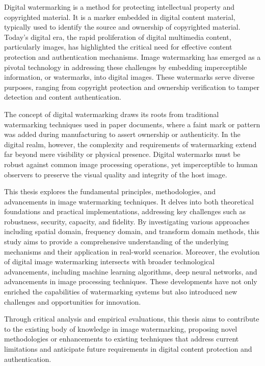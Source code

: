 Digital watermarking is a method for protecting intellectual property and copyrighted material. It is a marker embedded in digital content material, typically used to identify the source and ownership of copyrighted material. \cite{ref1} Today's digital era, the rapid proliferation of digital multimedia content, particularly images, has highlighted the critical need for effective content protection and authentication mechanisms. Image watermarking has emerged as a pivotal technology in addressing these challenges by embedding imperceptible information, or watermarks, into digital images. These watermarks serve diverse purposes, ranging from copyright protection and ownership verification to tamper detection and content authentication.

The concept of digital watermarking draws its roots from traditional watermarking techniques used in paper documents, where a faint mark or pattern was added during manufacturing to assert ownership or authenticity. In the digital realm, however, the complexity and requirements of watermarking extend far beyond mere visibility or physical presence. Digital watermarks must be robust against common image processing operations, yet imperceptible to human observers to preserve the visual quality and integrity of the host image.

This thesis explores the fundamental principles, methodologies, and advancements in image watermarking techniques. It delves into both theoretical foundations and practical implementations, addressing key challenges such as robustness, security, capacity, and fidelity. By investigating various approaches including spatial domain, frequency domain, and transform domain methods, this study aims to provide a comprehensive understanding of the underlying mechanisms and their application in real-world scenarios. Moreover, the evolution of digital image watermarking intersects with broader technological advancements, including machine learning algorithms, deep neural networks, and advancements in image processing techniques. These developments have not only enriched the capabilities of watermarking systems but also introduced new challenges and opportunities for innovation.

Through critical analysis and empirical evaluations, this thesis aims to contribute to the existing body of knowledge in image watermarking, proposing novel methodologies or enhancements to existing techniques that address current limitations and anticipate future requirements in digital content protection and authentication.

